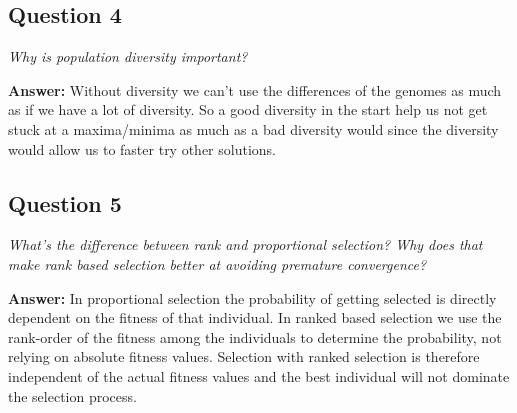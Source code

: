 \documentclass[a4paper]{article}
\begin{document}
\subsection*{Question 4}
\emph{Why is population diversity important?}

\textbf{Answer:} Without diversity we can't use the differences of the genomes as much as if we have a lot of diversity. So a good diversity in the start help us not get stuck at a maxima/minima as much as a bad diversity would since the diversity would allow us to faster try other solutions.

\subsection*{Question 5}
\emph{What's the difference between rank and proportional selection?
Why does that make rank based selection better at avoiding premature convergence?}

\textbf{Answer:} In proportional selection the probability of getting selected is directly dependent on the fitness of that individual. In ranked based selection we use the rank-order of the fitness among the individuals to determine the probability, not relying on absolute fitness values. Selection with ranked selection is therefore independent of the actual fitness values and the best individual will not dominate the selection process. %
\end{document}
